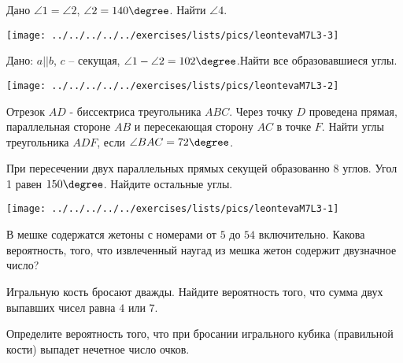 \begin{class}[number=3]
	\begin{listofex}
		\item 
		\begin{minipage}[t]{\bodywidth}
			Дано \( \angle 1 = \angle 2 \), \( \angle 2=140\degree \). Найти \( \angle 4 \).
		\end{minipage}
		\hspace{0.02\linewidth}
		\begin{minipage}[t]{\picwidth}
			\texttt{[image: ../../../../../exercises/lists/pics/leontevaM7L3-3]}
		\end{minipage}
		\begin{minipage}[t]{\bodywidth}
			\item Дано: \( a || b \), \( c \) – секущая, \( \angle 1 - \angle 2 = 102\degree \).Найти все образовавшиеся углы.
		\end{minipage}
		\hspace{0.02\linewidth}
		\begin{minipage}[t]{\picwidth}
			\texttt{[image: ../../../../../exercises/lists/pics/leontevaM7L3-2]}
		\end{minipage}
		\item Отрезок \( AD \) - биссектриса треугольника \( ABC \). Через точку \( D \) проведена прямая, параллельная стороне \( AB \) и пересекающая сторону \( AC \) в точке \( F \).
		Найти углы треугольника \( ADF \), если \( \angle BAC=72\degree \).
		\item 
		\begin{minipage}[t]{\bodywidth}
			При пересечении двух параллельных прямых секущей образованно 8 углов. Угол 1 равен \( 150\degree \). Найдите остальные углы.
		\end{minipage}
		\hspace{0.02\linewidth}
		\begin{minipage}[t]{\picwidth}
			\texttt{[image: ../../../../../exercises/lists/pics/leontevaM7L3-1]}
		\end{minipage}
		\item В мешке содержатся жетоны с номерами от \( 5 \) до \( 54 \) включительно. Какова вероятность, того, что извлеченный наугад из мешка жетон содержит двузначное число?
		\item Игральную кость бросают дважды. Найдите вероятность того, что сумма двух выпавших чисел равна \( 4 \) или \( 7 \).
		\item Определите вероятность того, что при бросании игрального кубика (правильной кости) выпадет нечетное число очков.

\end{listofex}
\end{class}
